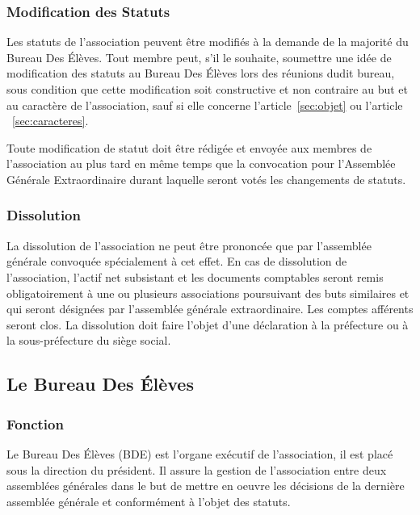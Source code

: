 \documentclass{article} %
\begin{document}
			\subsubsection{Modification des Statuts}
				Les statuts de l’association peuvent être modifiés à la demande de la
				majorité du Bureau Des Élèves. Tout membre peut, s’il le souhaite,
				soumettre une idée de modification des statuts au Bureau Des Élèves
				lors des réunions dudit bureau, sous condition que cette modification
				soit constructive et non contraire au but et au caractère de
				l’association, sauf si elle concerne l'article~\ref{sec:objet}
				ou l'article ~\ref{sec:caracteres}.

				Toute modification de statut doit être rédigée et envoyée aux membres
				de l’association au plus tard en même temps que la convocation pour
				l’Assemblée Générale Extraordinaire durant laquelle seront votés les
				changements de statuts.

			\subsubsection{Dissolution}
				La dissolution de l’association ne peut être prononcée que par
				l’assemblée générale convoquée spécialement à cet effet.
				En cas de dissolution de l’association, l’actif net subsistant et les
				documents comptables seront remis obligatoirement à une ou plusieurs
				associations poursuivant des buts similaires et qui seront désignées
				par l’assemblée générale extraordinaire. Les comptes afférents seront
				clos.
				La dissolution doit faire l’objet d’une déclaration à la préfecture
				ou à la sous-préfecture du siège social.

		\subsection{Le Bureau Des Élèves}
			\subsubsection{Fonction}
				Le Bureau Des Élèves (BDE) est l'organe exécutif de l'association, il
				est placé sous la direction du président. Il assure la gestion de
				l'association entre deux assemblées générales dans le but de mettre
				en oeuvre les décisions de la dernière assemblée générale et
				conformément à l'objet des statuts.
\end{document}

